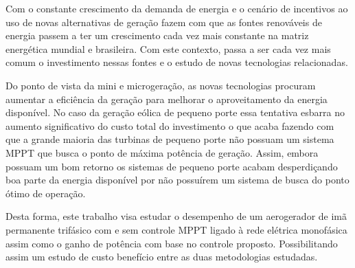 Com o constante crescimento da demanda de energia e o cenário de incentivos ao uso de novas alternativas de geração fazem com que as fontes renováveis de energia passem a ter um crescimento cada vez mais constante na matriz energética mundial e brasileira. Com este contexto, passa a ser cada vez mais comum o investimento nessas fontes e o estudo de novas tecnologias relacionadas.

Do ponto de vista da mini e microgeração, as novas tecnologias procuram aumentar a eficiência da geração para melhorar o aproveitamento da energia disponível. No caso da geração eólica de pequeno porte essa tentativa esbarra no aumento significativo do custo total do investimento o que acaba fazendo com que a grande maioria das turbinas de pequeno porte não possuam um sistema MPPT que busca o ponto de máxima potência de geração. Assim, embora possuam um bom retorno os sistemas de pequeno porte acabam desperdiçando boa parte da energia disponível por não possuírem um sistema de busca do ponto ótimo de operação.

Desta forma, este trabalho visa estudar o desempenho de um aerogerador de imã permanente trifásico com e sem controle MPPT ligado à rede elétrica monofásica assim como o ganho de potência com base no controle proposto. Possibilitando assim um estudo de custo benefício entre as duas metodologias estudadas.


